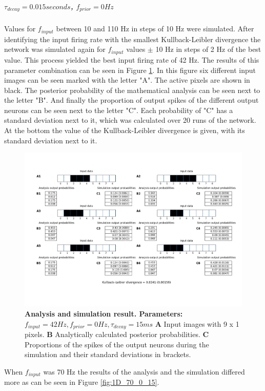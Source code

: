 \subparagraph{$\tau_{decay} = 0.015 seconds$, $f_{prior} = 0 Hz$}
Values for $f_{input}$ between 10 and 110 Hz in steps of 10 Hz were simulated. After identifying the input firing rate with the smallest Kullback-Leibler divergence the network was simulated again for $f_{input}$ values $\pm$ 10 Hz in steps of 2 Hz of the best value. This process yielded the best input firing rate of 42 Hz. The results of this parameter combination can be seen in Figure \ref{fig:1D_42_0_15}. In this figure six different input images can be seen marked with the letter "A". The active pixels are shown in black.  The posterior probability of the mathematical analysis can be seen next to the letter "B". And finally the proportion of output spikes of the different output neurons can be seen next to the letter "C". Each probability of "C" has a standard deviation next to it, which was calculated over 20 runs of the network. At the bottom the value of the Kullback-Leibler divergence is given, with its standard deviation next to it.

\begin{figure}
  \includegraphics[width=\linewidth]{figures/1D/1D_42_0_15.png}
  \caption{\textbf{Analysis and simulation result. Parameters: } $f_{input} = 42 Hz, f_{prior} = 0 Hz, \tau_{decay} = 15 ms$ \textbf{A} Input images with 9 x 1 pixels. \textbf{B} Analytically calculated posterior probabilities. \textbf{C} Proportions of the spikes of the output neurons during the simulation and their standard deviations in brackets.}
  \label{fig:1D_42_0_15}
\end{figure}

When $f_{input}$ was 70 Hz the results of the analysis and the simulation differed more as can be seen in Figure \ref{fig:1D_70_0_15}.

